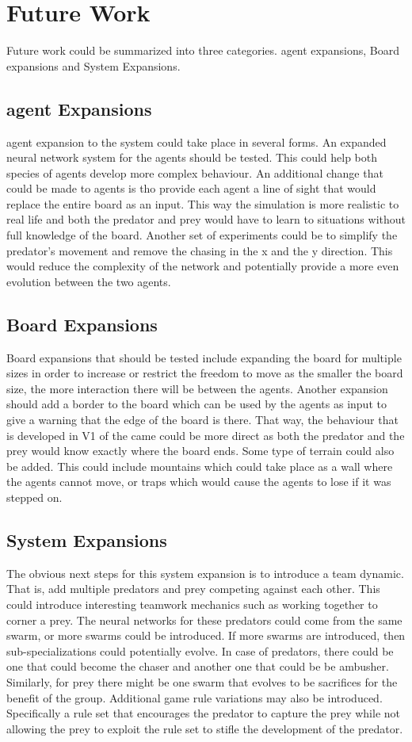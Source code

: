 
\section{Future Work}
Future work could be summarized into three categories. agent expansions, Board expansions and System Expansions.

\subsection{agent Expansions}
agent expansion to the system could take place in several forms. An expanded neural network system for the agents should be tested. This could help both species of agents develop more complex behaviour. An additional change that could be made to agents is tho provide each agent a line of sight that would replace the entire board as an input. This way the simulation is more realistic to real life and both the predator and prey would have to learn to situations without full knowledge of the board. Another set of experiments could be to simplify the predator's movement and remove the chasing in the x and the y direction. This would reduce the complexity of the network and potentially provide a more even evolution between the two agents.


\subsection{Board Expansions}
Board expansions that should be tested include expanding the board for multiple sizes in order to increase or restrict the freedom to move as the smaller the board size, the more interaction there will be between the agents. Another expansion should add a border to the board which can be used by the agents as input to give a warning that the edge of the board is there. That way, the behaviour that is developed in V1 of the came could be more direct as both the predator and the prey would know exactly where the board ends. Some type of terrain could also be added. This could include mountains which could take place as a wall where the agents cannot move, or traps which would cause the agents to lose if it was stepped on.


\subsection{System Expansions}
The obvious next steps for this system expansion is to introduce a team dynamic. That is, add multiple predators and prey competing against each other. This could introduce interesting teamwork mechanics such as working together to corner a prey. The neural networks for these predators could come from the same swarm, or more swarms could be introduced. If more swarms are introduced, then sub-specializations could potentially evolve. In case of predators, there could be one that could become the chaser and another one that could be be ambusher. Similarly, for prey there might be one swarm that evolves to be sacrifices for the benefit of the group. Additional game rule variations may also be introduced. Specifically a rule set that encourages the predator to capture the prey while not allowing the prey to exploit the rule set to stifle the development of the predator.